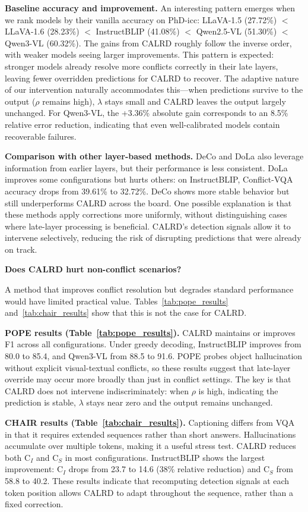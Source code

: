 \noindent \textbf{Baseline accuracy and improvement.} An interesting pattern emerges when we rank models by their vanilla accuracy on PhD-icc: LLaVA-1.5 (27.72\%) $<$ LLaVA-1.6 (28.23\%) $<$ InstructBLIP (41.08\%) $<$ Qwen2.5-VL (51.30\%) $<$ Qwen3-VL (60.32\%). The gains from CALRD roughly follow the inverse order, with weaker models seeing larger improvements. This pattern is expected: stronger models already resolve more conflicts correctly in their late layers, leaving fewer overridden predictions for CALRD to recover. The adaptive nature of our intervention naturally accommodates this---when predictions survive to the output ($\rho$ remains high), $\lambda$ stays small and CALRD leaves the output largely unchanged. For Qwen3-VL, the +3.36\% absolute gain corresponds to an 8.5\% relative error reduction, indicating that even well-calibrated models contain recoverable failures.


\noindent \textbf{Comparison with other layer-based methods.} DeCo and DoLa also leverage information from earlier layers, but their performance is less consistent. DoLa improves some configurations but hurts others: on InstructBLIP, Conflict-VQA accuracy drops from 39.61\% to 32.72\%. DeCo shows more stable behavior but still underperforms CALRD across the board. One possible explanation is that these methods apply corrections more uniformly, without distinguishing cases where late-layer processing is beneficial. CALRD's detection signals allow it to intervene selectively, reducing the risk of disrupting predictions that were already on track.


\textbf{Does CALRD hurt non-conflict scenarios?}

A method that improves conflict resolution but degrades standard performance would have limited practical value. Tables~\ref{tab:pope_results} and~\ref{tab:chair_results} show that this is not the case for CALRD.

\noindent \textbf{POPE results (Table~\ref{tab:pope_results}).} CALRD maintains or improves F1 across all configurations. Under greedy decoding, InstructBLIP improves from 80.0 to 85.4, and Qwen3-VL from 88.5 to 91.6. POPE probes object hallucination without explicit visual-textual conflicts, so these results suggest that late-layer override may occur more broadly than just in conflict settings. The key is that CALRD does not intervene indiscriminately: when $\rho$ is high, indicating the prediction is stable, $\lambda$ stays near zero and the output remains unchanged.

\noindent \textbf{CHAIR results (Table~\ref{tab:chair_results}).} Captioning differs from VQA in that it requires extended sequences rather than short answers. Hallucinations accumulate over multiple tokens, making it a useful stress test. CALRD reduces both $\text{C}_I$ and $\text{C}_S$ in most configurations. InstructBLIP shows the largest improvement: $\text{C}_I$ drops from 23.7 to 14.6 (38\% relative reduction) and $\text{C}_S$ from 58.8 to 40.2. These results indicate that recomputing detection signals at each token position allows CALRD to adapt throughout the sequence, rather than a fixed correction.


